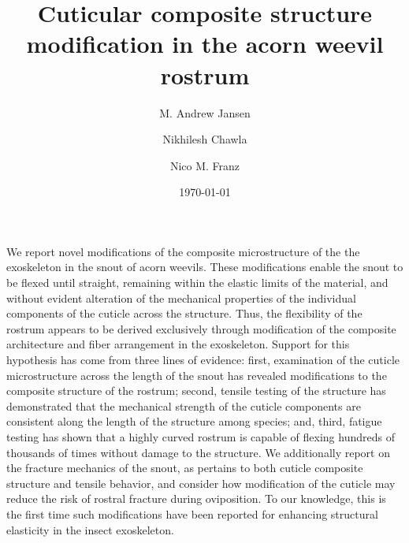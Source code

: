 \documentclass[twocolumn, linenumbers, superscriptaddress]{revtex4-1}
\begin{document}
	\begin{abstract}
		\blindtext
	\end{abstract}
	
	{\title{Cuticular composite structure modification in the acorn weevil rostrum}
	
	\date{\today}
	
	\author{M. Andrew Jansen}
	\author{Nikhilesh Chawla}
	\author{Nico M. Franz}
		
	\maketitle
	}
	
	We report novel modifications of the composite microstructure of the the exoskeleton in the snout of acorn weevils.
	These modifications enable the snout to be flexed until straight, remaining within the elastic limits of the material, and without evident alteration of the mechanical properties of the individual components of the cuticle across the structure.
	Thus, the flexibility of the rostrum appears to be derived exclusively through modification of the composite architecture and fiber arrangement in the exoskeleton.
	Support for this hypothesis has come from three lines of evidence: first, examination of the cuticle microstructure across the length of the snout has revealed modifications to the composite structure of the rostrum; second, tensile testing of the structure has demonstrated that the mechanical strength of the cuticle components are consistent along the length of the structure among species; and, third, fatigue testing has shown that a highly curved rostrum is capable of flexing hundreds of thousands of times without damage to the structure.
	We additionally report on the fracture mechanics of the snout, as pertains to both cuticle composite structure and tensile behavior, and consider how modification of the cuticle may reduce the risk of rostral fracture during oviposition.
	To our knowledge, this is the first time such modifications have been reported for enhancing structural elasticity in the insect exoskeleton.
	
\end{document}
